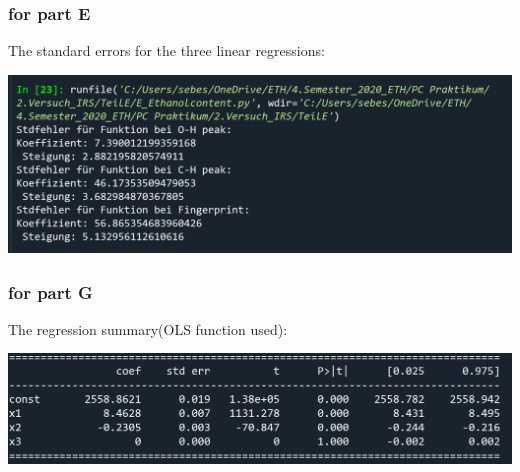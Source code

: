 \documentclass[a4paper,abstracton]{article}	                       %
\begin{document}
\subsubsection*{for part E}
The standard errors for the three linear regressions:

\includegraphics[width=\textwidth]{StandardfehlerE.PNG}

\subsubsection*{for part G}
The regression summary(OLS function used):

\includegraphics[width=\textwidth]{StandardfehlerG.PNG}
\end{document}
